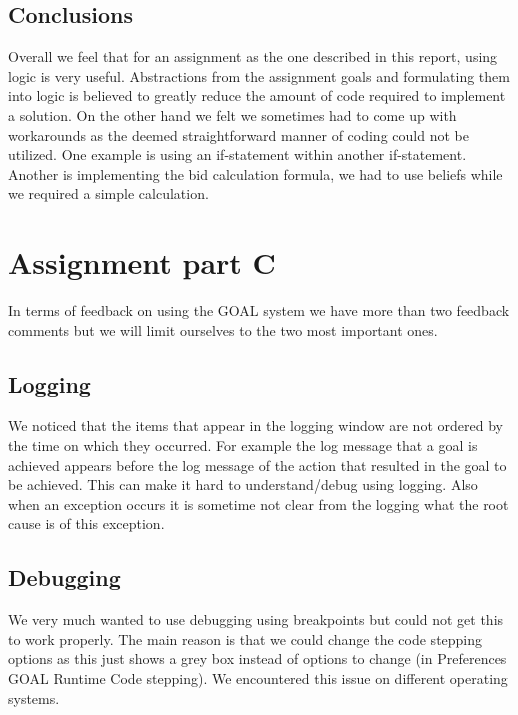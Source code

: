 \documentclass[a4paper,11pt]{article}
\begin{document}
\subsection{Conclusions}
Overall we feel that for an assignment as the one described in this report, using logic is very useful. Abstractions from the assignment goals and formulating them into logic is believed to greatly reduce the amount of code required to implement a solution. On the other hand we felt we sometimes had to come up with workarounds as the deemed straightforward manner of coding could not be utilized. One example is using an if-statement within another if-statement. Another is implementing the bid calculation formula, we had to use beliefs while we required a simple calculation. 

\section{Assignment part C}
In terms of feedback on using the GOAL system we have more than two feedback comments but we will limit ourselves to the two most important ones. 

\subsection{Logging}
We noticed that the items that appear in the logging window are not ordered by the time on which they occurred. For example the log message that a goal is achieved appears before the log message of the action that resulted in the goal to be achieved. This can make it hard to understand/debug using logging. Also when an exception occurs it is sometime not clear from the logging what the root cause is of this exception.

\subsection{Debugging}
We very much wanted to use debugging using breakpoints but could not get this to work properly. The main reason is that we could change the code stepping options as this just shows a grey box instead of options to change (in Preferences \textrightarrow GOAL \textrightarrow Runtime \textrightarrow Code stepping). We encountered this issue on different operating systems. 
\end{document}
